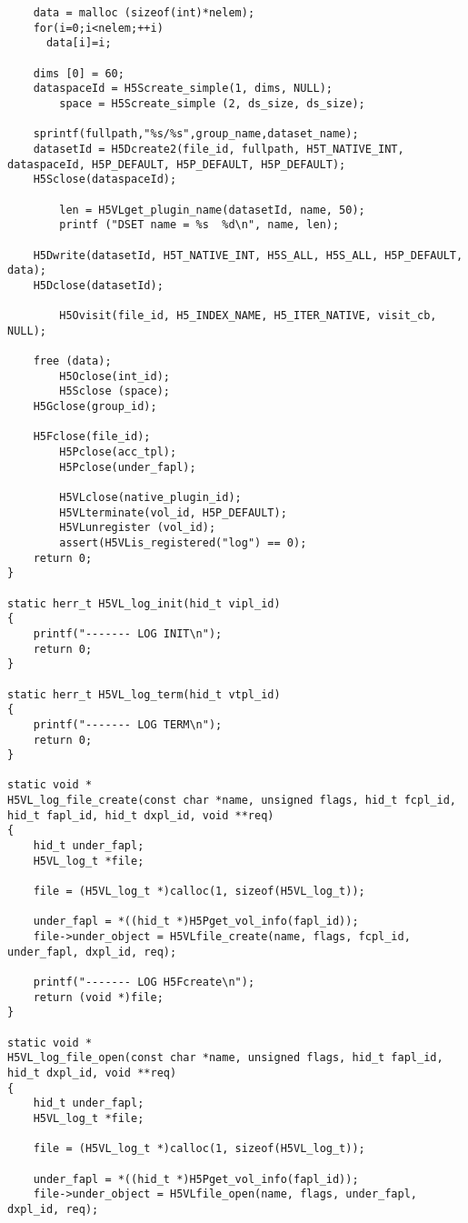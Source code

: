 \begin{appendices}
\begin{lstlisting}
	data = malloc (sizeof(int)*nelem);
	for(i=0;i<nelem;++i)
	  data[i]=i;

	dims [0] = 60;
	dataspaceId = H5Screate_simple(1, dims, NULL); 
        space = H5Screate_simple (2, ds_size, ds_size);

	sprintf(fullpath,"%s/%s",group_name,dataset_name);
	datasetId = H5Dcreate2(file_id, fullpath, H5T_NATIVE_INT, dataspaceId, H5P_DEFAULT, H5P_DEFAULT, H5P_DEFAULT);
	H5Sclose(dataspaceId);

        len = H5VLget_plugin_name(datasetId, name, 50);
        printf ("DSET name = %s  %d\n", name, len);

	H5Dwrite(datasetId, H5T_NATIVE_INT, H5S_ALL, H5S_ALL, H5P_DEFAULT, data);
	H5Dclose(datasetId);

        H5Ovisit(file_id, H5_INDEX_NAME, H5_ITER_NATIVE, visit_cb, NULL);

	free (data);
        H5Oclose(int_id);
        H5Sclose (space);
	H5Gclose(group_id);

	H5Fclose(file_id);
        H5Pclose(acc_tpl);
        H5Pclose(under_fapl);

        H5VLclose(native_plugin_id);
        H5VLterminate(vol_id, H5P_DEFAULT);
        H5VLunregister (vol_id);
        assert(H5VLis_registered("log") == 0);
	return 0;
}

static herr_t H5VL_log_init(hid_t vipl_id)
{
    printf("------- LOG INIT\n");
    return 0;
}

static herr_t H5VL_log_term(hid_t vtpl_id)
{
    printf("------- LOG TERM\n");
    return 0;
}

static void *
H5VL_log_file_create(const char *name, unsigned flags, hid_t fcpl_id, hid_t fapl_id, hid_t dxpl_id, void **req)
{
    hid_t under_fapl;
    H5VL_log_t *file;

    file = (H5VL_log_t *)calloc(1, sizeof(H5VL_log_t));

    under_fapl = *((hid_t *)H5Pget_vol_info(fapl_id));
    file->under_object = H5VLfile_create(name, flags, fcpl_id, under_fapl, dxpl_id, req);

    printf("------- LOG H5Fcreate\n");
    return (void *)file;
}

static void *
H5VL_log_file_open(const char *name, unsigned flags, hid_t fapl_id, hid_t dxpl_id, void **req)
{
    hid_t under_fapl;
    H5VL_log_t *file;

    file = (H5VL_log_t *)calloc(1, sizeof(H5VL_log_t));

    under_fapl = *((hid_t *)H5Pget_vol_info(fapl_id));
    file->under_object = H5VLfile_open(name, flags, under_fapl, dxpl_id, req);


\end{lstlisting}
\end{appendices}
